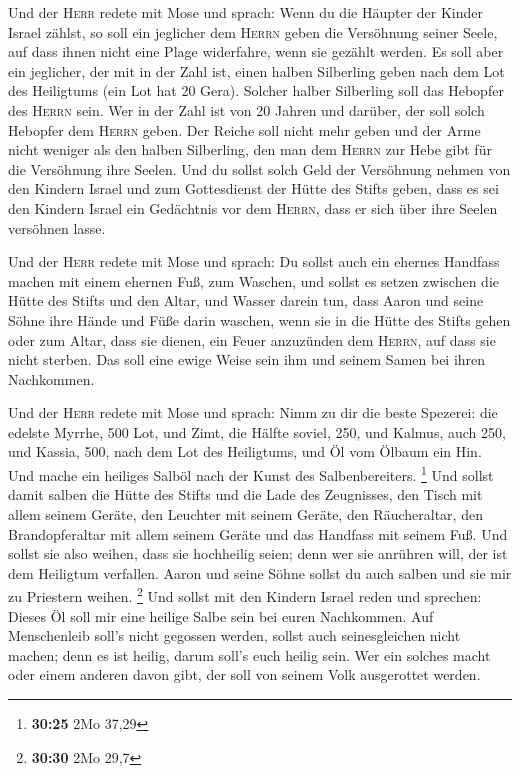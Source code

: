  Und der \textsc{Herr} redete mit Mose und sprach:
 Wenn du die Häupter der Kinder Israel zählst, so soll
ein jeglicher dem \textsc{Herrn} geben die Versöhnung seiner Seele, auf
dass ihnen nicht eine Plage widerfahre, wenn sie gezählt werden.
 Es soll aber ein jeglicher, der mit in der Zahl ist,
einen halben Silberling geben nach dem Lot des Heiligtums (ein Lot hat
20 Gera). Solcher halber Silberling soll das Hebopfer des \textsc{Herrn}
sein.  Wer in der Zahl ist von 20 Jahren und darüber, der
soll solch Hebopfer dem \textsc{Herrn} geben.  Der Reiche
soll nicht mehr geben und der Arme nicht weniger als den halben
Silberling, den man dem \textsc{Herrn} zur Hebe gibt für die Versöhnung
ihre Seelen.  Und du sollst solch Geld der Versöhnung
nehmen von den Kindern Israel und zum Gottesdienst der Hütte des Stifts
geben, dass es sei den Kindern Israel ein Gedächtnis vor dem
\textsc{Herrn}, dass er sich über ihre Seelen versöhnen lasse.

 Und der \textsc{Herr} redete mit Mose und sprach:
 Du sollst auch ein ehernes Handfass machen mit einem
ehernen Fuß, zum Waschen, und sollst es setzen zwischen die Hütte des
Stifts und den Altar, und Wasser darein tun,  dass Aaron
und seine Söhne ihre Hände und Füße darin waschen,  wenn
sie in die Hütte des Stifts gehen oder zum Altar, dass sie dienen, ein
Feuer anzuzünden dem \textsc{Herrn},  auf dass sie nicht
sterben. Das soll eine ewige Weise sein ihm und seinem Samen bei ihren
Nachkommen.

 Und der \textsc{Herr} redete mit Mose und sprach:
 Nimm zu dir die beste Spezerei: die edelste Myrrhe, 500
Lot, und Zimt, die Hälfte soviel, 250, und Kalmus, auch 250,
 und Kassia, 500, nach dem Lot des Heiligtums, und Öl vom
Ölbaum ein Hin.  Und mache ein heiliges Salböl nach der
Kunst des Salbenbereiters. \footnote{\textbf{30:25} 2Mo 37,29}
 Und sollst damit salben die Hütte des Stifts und die
Lade des Zeugnisses,  den Tisch mit allem seinem Geräte,
den Leuchter mit seinem Geräte, den Räucheraltar,  den
Brandopferaltar mit allem seinem Geräte und das Handfass mit seinem Fuß.
 Und sollst sie also weihen, dass sie hochheilig seien;
denn wer sie anrühren will, der ist dem Heiligtum verfallen.
 Aaron und seine Söhne sollst du auch salben und sie mir
zu Priestern weihen. \footnote{\textbf{30:30} 2Mo 29,7} 
Und sollst mit den Kindern Israel reden und sprechen: Dieses Öl soll mir
eine heilige Salbe sein bei euren Nachkommen.  Auf
Menschenleib soll's nicht gegossen werden, sollst auch seinesgleichen
nicht machen; denn es ist heilig, darum soll's euch heilig sein.
 Wer ein solches macht oder einem anderen davon gibt, der
soll von seinem Volk ausgerottet werden.

